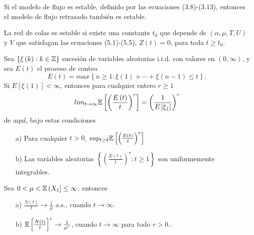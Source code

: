 \begin{Lema}\label{Lema3.1}
Si el modelo de flujo es estable, definido por las ecuaciones
(3.8)-(3.13), entonces el modelo de flujo retrasado tambi\'en es
estable.
\end{Lema}

\begin{Teo}\label{Tma.5.1.Chen}
La red de colas es estable si existe una constante $t_{0}$ que
depende de $\left(\alpha,\mu,T,U\right)$ y $V$ que satisfagan las
ecuaciones (5.1)-(5.5), $Z\left(t\right)=0$, para toda $t\geq
t_{0}$.
\end{Teo}



\begin{Lema}\label{Lema.5.2.Gut}
Sea $\left\{\xi\left(k\right):k\in\mathbb{Z}\right\}$ sucesi\'on de
variables aleatorias i.i.d. con valores en
$\left(0,\infty\right)$, y sea $E\left(t\right)$ el proceso de
conteo
\[E\left(t\right)=max\left\{n\geq1:\xi\left(1\right)+\cdots+\xi\left(n-1\right)\leq t\right\}.\]
Si $E\left[\xi\left(1\right)\right]<\infty$, entonces para
cualquier entero $r\geq1$
\begin{equation}
lim_{t\rightarrow\infty}\mathbb{E}\left[\left(\frac{E\left(t\right)}{t}\right)^{r}\right]=\left(\frac{1}{E\left[\xi_{1}\right]}\right)^{r}
\end{equation}
de aqu\'i, bajo estas condiciones
\begin{itemize}
\item[a)] Para cualquier $t>0$,
$sup_{t\geq\delta}\mathbb{E}\left[\left(\frac{E\left(t\right)}{t}\right)^{r}\right]$

\item[b)] Las variables aleatorias
$\left\{\left(\frac{E\left(t\right)}{t}\right)^{r}:t\geq1\right\}$
son uniformemente integrables.
\end{itemize}
\end{Lema}

\begin{Teo}\label{Tma.5.1.Gut} Sea
$0<\mu<\mathbb{E}\left(X_{1}\right]\leq\infty$. entonces

\begin{itemize}
\item[a)] $\frac{N\left(t\right)}{t}\rightarrow\frac{1}{\mu}$
a.s., cuando $t\rightarrow\infty$.


\item[b)]$\mathbb{E}\left[\frac{N\left(t\right)}{t}\right]^{r}\rightarrow\frac{1}{\mu^{r}}$,
cuando $t\rightarrow\infty$ para todo $r>0$..
\end{itemize}
\end{Teo}


